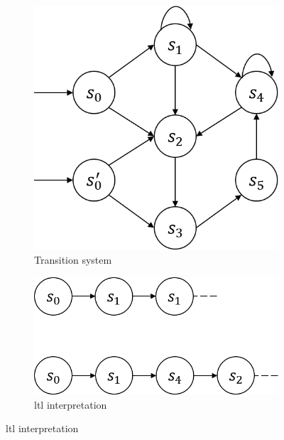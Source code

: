 \begin{figure}
    \def\subfigw{0.5\textwidth}
    \def\figscale{0.4}
    \begin{subfigure}[b]{\subfigw}
        \centering
        \includegraphics[scale=\figscale]{figures/transition-system.png}
        \caption{Transition system}
        \label{fig:trans-sys}
    \end{subfigure}
    \begin{subfigure}[b]{\subfigw}
        \centering
        \includegraphics[scale=\figscale]{figures/ltl-interpretation.png}
        \caption{\gls{ltl} interpretation}
        \label{fig:ltl-int}
    \end{subfigure}


\end{figure}

